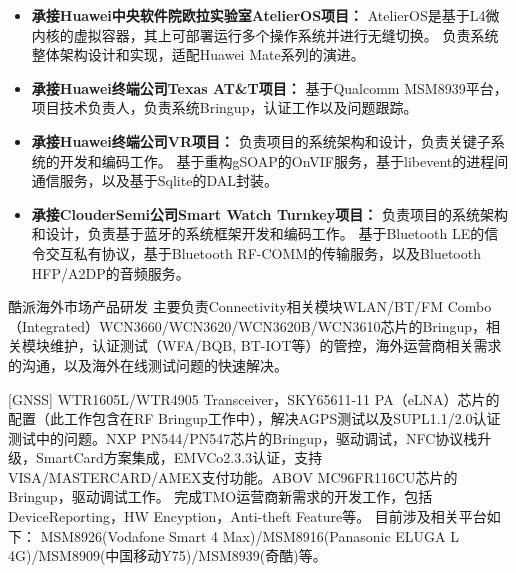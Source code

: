 \documentclass{resume}
\begin{document}
\begin{itemize}
  \item \textbf{承接Huawei中央软件院欧拉实验室AtelierOS项目：}
AtelierOS是基于L4微内核的虚拟容器，其上可部署运行多个操作系统并进行无缝切换。
负责系统整体架构设计和实现，适配Huawei Mate系列的演进。
  \item \textbf{承接Huawei终端公司Texas AT&T项目：}
基于Qualcomm MSM8939平台，项目技术负责人，负责系统Bringup，认证工作以及问题跟踪。 
  \item \textbf{承接Huawei终端公司VR项目：}
负责项目的系统架构和设计，负责关键子系统的开发和编码工作。
基于重构gSOAP的OnVIF服务，基于libevent的进程间通信服务，以及基于Sqlite的DAL封装。
  \item \textbf{承接ClouderSemi公司Smart Watch Turnkey项目：}
负责项目的系统架构和设计，负责基于蓝牙的系统框架开发和编码工作。
基于Bluetooth LE的信令交互私有协议，基于Bluetooth RF-COMM的传输服务，以及Bluetooth HFP/A2DP的音频服务。
\end{itemize}
\spaceline{}

酷派海外市场产品研发\newline
主要负责Connectivity相关模块WLAN/BT/FM Combo（Integrated）WCN3660/WCN3620/WCN3620B/WCN3610芯片的Bringup，相关模块维护，认证测试（WFA/BQB, BT-IOT等）的管控，海外运营商相关需求的沟通，以及海外在线测试问题的快速解决。

[GNSS] WTR1605L/WTR4905 Transceiver，SKY65611-11 PA（eLNA）芯片的配置（此工作包含在RF Bringup工作中），解决AGPS测试以及SUPL1.1/2.0认证测试中的问题。\newline
[NFC] NXP PN544/PN547芯片的Bringup，驱动调试，NFC协议栈升级，SmartCard方案集成，EMVCo2.3.3认证，支持VISA/MASTERCARD/AMEX支付功能。\newline
[IR] ABOV MC96FR116CU芯片的Bringup，驱动调试工作。\newline
完成TMO运营商新需求的开发工作，包括DeviceReporting，HW Encyption，Anti-theft Feature等。\newline
\newline
目前涉及相关平台如下：\newline
MSM8926(Vodafone Smart 4 Max)/MSM8916(Panasonic ELUGA L 4G)/MSM8909(中国移动Y75)/MSM8939(奇酷)等。\newline
\spaceline{}
\end{document}
